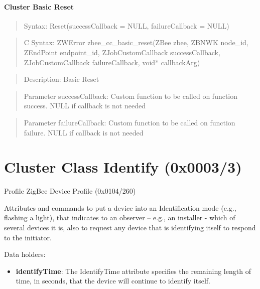 \paragraph{Cluster Basic Reset}
\begin{quote}Syntax: Reset(successCallback = NULL, failureCallback = NULL)\end{quote}
\begin{quote}C Syntax: ZWError zbee\_cc\_basic\_reset(ZBee zbee, ZBNWK node\_id, ZEndPoint endpoint\_id, ZJobCustomCallback successCallback, ZJobCustomCallback failureCallback, void* callbackArg)\end{quote}
\begin{quote}Description: Basic Reset\end{quote}
\begin{quote}Parameter successCallback: Custom function to be called on function success. NULL if callback is not needed\end{quote}
\begin{quote}Parameter failureCallback: Custom function to be called on function failure. NULL if callback is not needed\end{quote}



\section{Cluster Class Identify (0x0003/3)}

Profile ZigBee Device Profile (0x0104/260)

Attributes and commands to put a device into an Identification mode (e.g., flashing a light), that indicates to an observer – e.g., an installer - which of several devices it is, also to request any device that is identifying itself to respond to the initiator.
\newline

\noindent
Data holders:

\begin{itemize}
\item \textbf{identifyTime}: The IdentifyTime attribute specifies the remaining length of time, in seconds, that the device will continue to identify itself.
\end{itemize}


